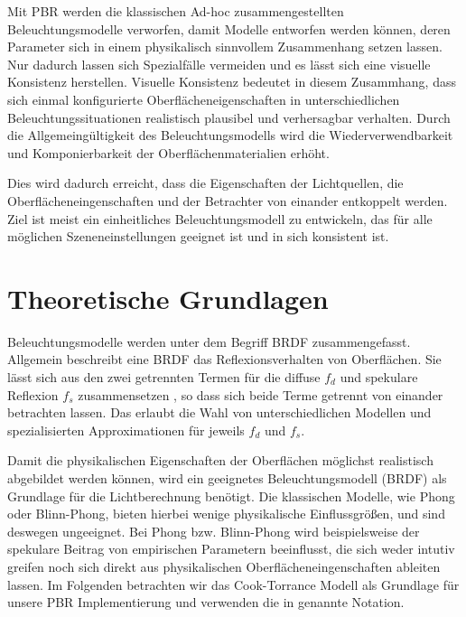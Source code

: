 Mit \ac{PBR} werden die klassischen Ad-hoc zusammengestellten Beleuchtungsmodelle verworfen, damit Modelle entworfen werden können, deren Parameter sich in einem physikalisch sinnvollem Zusammenhang setzen lassen. Nur dadurch lassen sich Spezialfälle vermeiden und es lässt sich eine visuelle Konsistenz herstellen. Visuelle Konsistenz bedeutet in diesem Zusammhang, dass sich einmal konfigurierte Oberflächeneigenschaften in unterschiedlichen Beleuchtungssituationen realistisch plausibel und verhersagbar verhalten. Durch die Allgemeingültigkeit des Beleuchtungsmodells wird die Wiederverwendbarkeit und Komponierbarkeit der Oberflächenmaterialien erhöht\parencite[Seite 1]{Burley2012}.

Dies wird dadurch erreicht, dass die Eigenschaften der Lichtquellen, die Oberflächeneingenschaften und der Betrachter von einander entkoppelt werden. Ziel ist meist ein einheitliches Beleuchtungsmodell zu entwickeln, das für alle möglichen Szeneneinstellungen geeignet ist und in sich konsistent ist.

\section{Theoretische Grundlagen}
\label{sec:pbr-grundlagen}

Beleuchtungsmodelle werden unter dem Begriff \acf{BRDF} zusammengefasst. Allgemein beschreibt eine \ac{BRDF} das Reflexionsverhalten von Oberflächen. Sie lässt sich aus den zwei getrennten Termen für die diffuse $f_d$ und spekulare Reflexion $f_s$ zusammensetzen \parencite[Kapitel 3.1.2, Seite 7]{Rousiers2014}, so dass sich beide Terme getrennt von einander betrachten lassen. Das erlaubt die Wahl von unterschiedlichen Modellen und spezialisierten Approximationen für jeweils $f_d$ und $f_s$.

Damit die physikalischen Eigenschaften der Oberflächen möglichst realistisch abgebildet werden können, wird ein geeignetes Beleuchtungsmodell (\ac{BRDF}) als Grundlage für die Lichtberechnung benötigt. Die klassischen Modelle, wie Phong oder Blinn-Phong, bieten hierbei wenige physikalische Einflussgrößen, und sind deswegen ungeeignet. Bei Phong bzw. Blinn-Phong wird beispielsweise der spekulare Beitrag von empirischen Parametern beeinflusst, die sich weder intutiv greifen noch sich direkt aus physikalischen Oberflächeneingenschaften ableiten lassen. Im Folgenden betrachten wir das Cook-Torrance Modell als Grundlage für unsere \ac{PBR} Implementierung und verwenden die in  genannte Notation.

